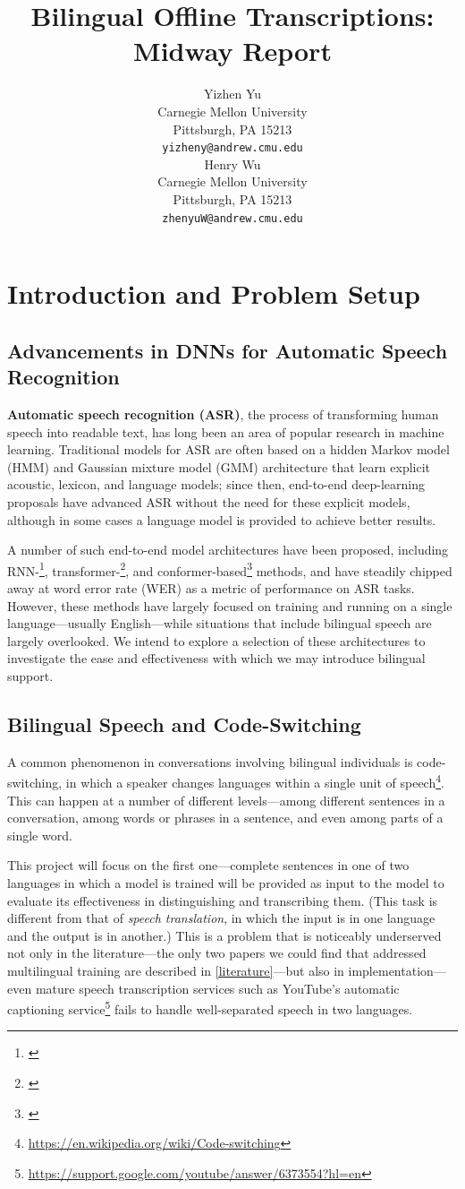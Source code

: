 \documentclass{article}
\title{Bilingual Offline Transcriptions: Midway Report}
\author{
  Yizhen Yu \\
  Carnegie Mellon University\\
  Pittsburgh, PA 15213 \\
  \texttt{yizheny@andrew.cmu.edu} \\\And
  Henry Wu \\
  Carnegie Mellon University \\
  Pittsburgh, PA 15213 \\
  \texttt{zhenyuW@andrew.cmu.edu}
}
\begin{document}
  \maketitle
  \section{Introduction and Problem Setup}
  \subsection{Advancements in DNNs for Automatic Speech Recognition}
  \textbf{Automatic speech recognition (ASR)}, the process of transforming human speech into readable text, has long been an area of popular research in machine learning. Traditional models for ASR are often based on a hidden Markov model (HMM) and Gaussian mixture model (GMM) architecture that learn explicit acoustic, lexicon, and language models; since then, end-to-end deep-learning proposals have advanced ASR without the need for these explicit models, although in some cases a language model is provided to achieve better results.

  A number of such end-to-end model architectures have been proposed, including RNN-\footnote{\cite{Chan}}, transformer-\footnote{\cite{Vaswani}}, and conformer-based\footnote{\cite{Gulati}} methods, and have steadily chipped away at word error rate (WER) as a metric of performance on ASR tasks. However, these methods have largely focused on training and running on a single language---usually English---while situations that include bilingual speech are largely overlooked. We intend to explore a selection of these architectures to investigate the ease and effectiveness with which we may introduce bilingual support.
  \subsection{Bilingual Speech and Code-Switching}
  A common phenomenon in conversations involving bilingual individuals is code-switching, in which a speaker changes languages within a single unit of speech\footnote{\url{https://en.wikipedia.org/wiki/Code-switching}}. This can happen at a number of different levels—among different sentences in a conversation, among words or phrases in a sentence, and even among parts of a single word.

  This project will focus on the first one---complete sentences in one of two languages in which a model is trained will be provided as input to the model to evaluate its effectiveness in distinguishing and transcribing them. (This task is different from that of \textit{speech translation}, in which the input is in one language and the output is in another.) This is a problem that is noticeably underserved not only in the literature---the only two papers we could find that addressed multilingual training are described in \ref{literature}---but also in implementation---even mature speech transcription services such as YouTube's automatic captioning service\footnote{\url{https://support.google.com/youtube/answer/6373554?hl=en}} fails to handle well-separated speech in two languages.
\end{document}
